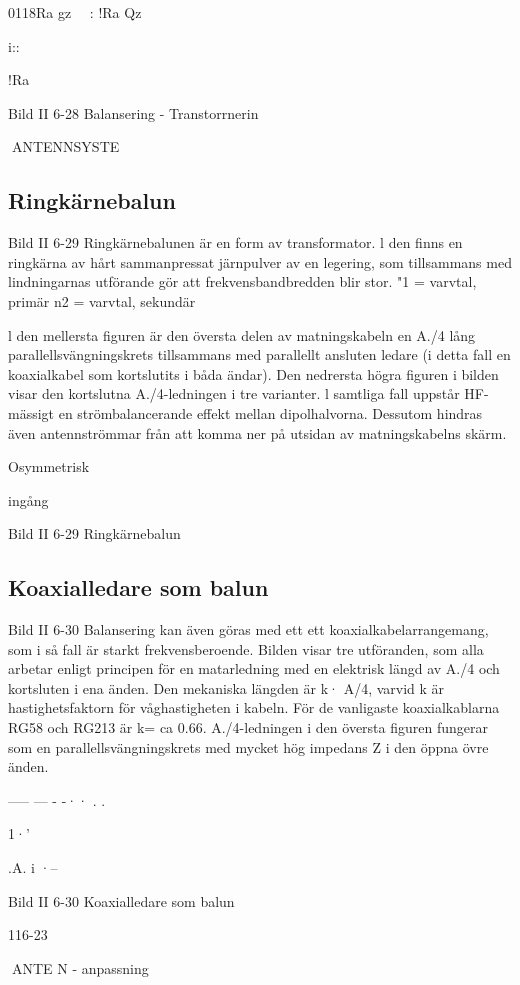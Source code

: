 0118Ra
gz
~~: !Ra
Qz

i::

!Ra

Bild II 6-28 Balansering - Transtorrnerin

ANTENNSYSTE
\subsection{Ringkärnebalun}

Bild II 6-29
Ringkärnebalunen är en form av transformator. l den finns en ringkärna av hårt
sammanpressat järnpulver av en legering,
som tillsammans med lindningarnas utförande gör att frekvensbandbredden blir stor.
"1 = varvtal, primär
n2 = varvtal, sekundär

l den mellersta figuren är den översta
delen av matningskabeln en A./4 lång parallellsvängningskrets tillsammans med parallellt ansluten ledare (i detta fall en koaxialkabel som kortslutits i båda ändar). Den
nedrersta högra figuren i bilden visar den
kortslutna A./4-ledningen i tre varianter. l
samtliga fall uppstår HF-mässigt en strömbalancerande effekt mellan dipolhalvorna.
Dessutom hindras även antennströmmar från att komma ner på utsidan av matningskabelns skärm.

Osymmetrisk

ingång

Bild II 6-29 Ringkärnebalun

\subsection{Koaxialledare som balun}

Bild II 6-30
Balansering kan även göras med ett ett
koaxialkabelarrangemang, som i så fall är
starkt frekvensberoende. Bilden visar tre
utföranden, som alla arbetar enligt principen för en matarledning med en elektrisk
längd av A./4 och kortsluten i ena änden.
Den mekaniska längden är k· A/4, varvid
k är hastighetsfaktorn för våghastigheten i
kabeln. För de vanligaste koaxialkablarna
RG58 och RG213 är k= ca 0.66.
A./4-ledningen i den översta figuren fungerar som en parallellsvängningskrets med
mycket hög impedans Z i den öppna övre
änden.

----- --- - -·· . .

1·'

.A.
i ·--

Bild II 6-30 Koaxialledare som balun

116-23

ANTE N
- anpassning

